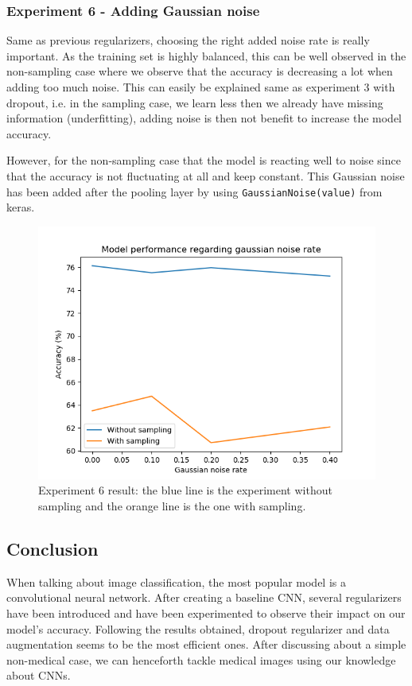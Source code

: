 \documentclass[11pt, openany]{report}
\theoremstyle{plain}
\theoremstyle{definition}
\theoremstyle{remark}
\begin{document}
\subsubsection{Experiment 6 - Adding Gaussian noise} 
Same as previous regularizers, choosing the right added noise rate is really important. As the training set is highly balanced, this can be well observed in the non-sampling case where we observe that the accuracy is decreasing a lot when adding too much noise. This can easily be explained same as experiment 3 with dropout, i.e. in the sampling case, we learn less then we already have missing information (underfitting), adding noise is then not benefit to increase the model accuracy.

However, for the non-sampling case that the model is reacting well to noise since that the accuracy is not fluctuating at all and keep constant. This Gaussian noise has been added after the pooling layer by using \texttt{GaussianNoise(value)} from keras.   

\begin{figure}[H]
  \centering
  \includegraphics[scale=0.6]{Code/ch5-ModelPrototype/figures_result/gaussian_noise_graph.png}
  \caption{Experiment 6 result: the blue line is the experiment without sampling and the orange line is the one with sampling.}
  \label{fig:cifar_noise_res}
\end{figure}


\subsection{Conclusion}
When talking about image classification, the most popular model is a convolutional neural network. After creating a baseline CNN, several regularizers have been introduced and have been experimented to observe their impact on our model's accuracy. Following the results obtained, dropout regularizer and data augmentation seems to be the most efficient ones. After discussing about a simple non-medical case, we can henceforth tackle medical images using our knowledge about CNNs. 
\end{document}
